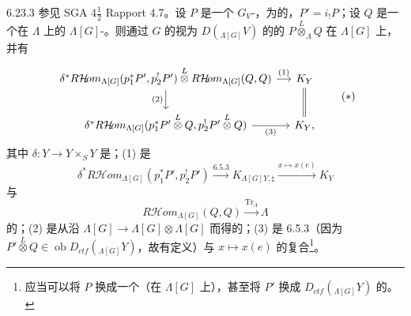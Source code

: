 \begin{SGAresult}{}{6.23.3}
参见 SGA $4\frac12$ Rapport 4.7。设 $P$ 是一个 $G_V$-，为的，$P'=i_!P$；设 $Q$ 是一个在 $\Lambda$ 上的 $\Lambda[G]$-。则通过 $G$ 的视为 $D({}_{\Lambda[G]}V)$ 的的 $P\overset L\otimes_\Lambda Q$ 在 $\Lambda[G]$ 上，并有
\[\begin{tikzcd}[column sep=small]
\delta^*R\mathcal H\!om_{\Lambda[G]}(p_1^*P',p_2^!P')\overset L\otimes R\mathcal H\!om_{\Lambda[G]}(Q,Q)\arrow[r,"(1)"]\arrow[d,"(2)"']&K_Y\arrow[d,equal]\\
\delta^*R\mathcal H\!om_{\Lambda[G]}(p_1^*P'\overset L\otimes Q,p_2^!P'\overset L\otimes Q)\arrow[r,"(3)"']&K_Y,
\end{tikzcd}\tag{$*$}\]
其中 $\delta:Y\to Y\times_SY$ 是；(1) 是
\[\delta^*R\mathcal H\!om_{\Lambda[G]}(p_1^*P',p_2^!P')\xrightarrow{6.5.3}K_{\Lambda[G]Y,\natural}\xrightarrow{x\mapsto x(e)}K_Y\]
与
\[R\mathcal H\!om_{\Lambda[G]}(Q,Q)\xrightarrow{\operatorname{Tr}_\Lambda}\Lambda\]
的；(2) 是从沿 $\Lambda[G]\to\Lambda[G]\otimes\Lambda[G]$ 而得的；(3) 是 6.5.3（因为 $P'\overset L\otimes Q\in\operatorname{ob}D_{ctf}({}_{\Lambda[G]}Y)$，故有定义）与 $x\mapsto x(e)$ 的复合\footnote{应当可以将 $P$ 换成一个（在 $\Lambda[G]$ 上），甚至将 $P'$ 换成 $D_{ctf}({}_{\Lambda[G]}Y)$ 的。}。
\end{SGAresult}
